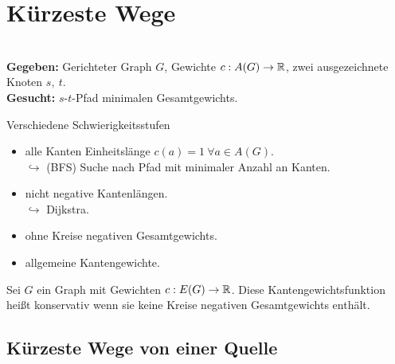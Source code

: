 \section{Kürzeste Wege}
\begin{problem}~\\[5pt]
	\hspace*{10pt}\textbf{Gegeben: }Gerichteter Graph $G$, Gewichte $c:A(G)\to \mathbb{R}$, zwei ausgezeichnete \hspace*{60pt} Knoten $s,~t$.\\[5pt]
	\hspace*{10pt}\textbf{Gesucht: }$s$-$t$-Pfad minimalen Gesamtgewichts.
\end{problem}
Verschiedene Schwierigkeitsstufen
\begin{itemize}
	\item alle Kanten Einheitslänge $c(a)=1~ \forall a\in A(G)$.\\
	$\hookrightarrow$ (BFS) Suche nach Pfad mit minimaler Anzahl an Kanten.
	\item nicht negative Kantenlängen.\\
	$\hookrightarrow$ Dijkstra.
	\item ohne Kreise negativen Gesamtgewichts.
	\item allgemeine Kantengewichte.
\end{itemize}
\begin{definition*}[Konservativ]
	Sei $G$ ein Graph mit Gewichten $c:E(G)\to \mathbb{R}$. Diese Kantengewichtsfunktion heißt konservativ wenn sie keine Kreise negativen Gesamtgewichts enthält.
\end{definition*}
\subsection{Kürzeste Wege von einer Quelle}